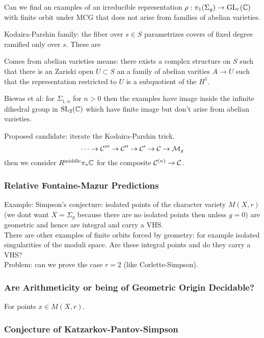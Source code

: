 \documentclass[12pt]{article}
\begin{document}
Can we find an examples of an irreducible representation $\rho : \pi_1(\Sigma_g) \to \mathrm{GL}_r(\mathbb{C})$ with finite orbit under MCG that does not arise from families of abelian varieties. 


\begin{example}
Kodaira-Parshin family: the fiber over $s \in S$ parametrizes covers of fixed degree ramified only over $s$. These are 
\end{example}

Comes from abelian varieties means: there exists a complex structure on $S$ such that there is an Zariski open $U \subset S$ an a family of abelian varities $A \to U$ such that the representation restricted to $U$ is a subquotient of the $H^1$. 

\begin{example}
Biswas et al: for $\Sigma_{1,n}$ for $n > 0$ then the examples have image inside the infinite dihedral group in $\mathrm{SL}_2(\mathbb{C})$ which have finite image but don't arise from abelian varieties. 
\end{example}

Proposed candidate: iterate the Kodaira-Parshin trick. 
\[ \cdots \to \mathcal{C}''' \to \mathcal{C}'' \to \mathcal{C}' \to \mathcal{C} \to \mathcal{M}_g \]
then we consider $R^{\text{middle}} \pi_* \mathbb{C}$ for the composite $\mathcal{C}^{(n)} \to \mathcal{C}$. 

\subsubsection{Relative Fontaine-Mazur Predictions}

Example: Simpson's conjecture: isolated points of the character variety $M(X,r)$ (we dont want $X = \Sigma_g$ because there are no isolated points then unless $g = 0$) are geometric and hence are integral and carry a VHS.
\\
There are other examples of finite orbits forced by geometry: for example isolated singularities of the moduli space. Are these integral points and do they carry a VHS? 
\\
Problem: can we prove the case $r = 2$ (like Corlette-Simpson).


\subsubsection{Are Arithmeticity or being of Geometric Origin Decidable?}

For points $x \in M(X, r)$. 

\subsubsection{Conjecture of Katzarkov-Pantov-Simpson}  
\end{document}
